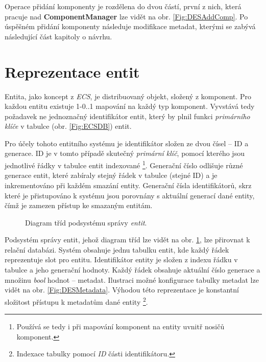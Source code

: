 Operace přidání komponenty je rozdělena do dvou částí, první z nich, která pracuje nad \textbf{ComponentManager} lze vidět na obr. \ref{Fig:DESAddComp}. Po úspěšném přidání komponenty následuje modifikace metadat, kterými se zabývá následující část kapitoly o návrhu.

\section{Reprezentace entit}

Entita, jako koncept z \emph{ECS}, je distribuovaný objekt, složený z komponent. Pro každou entitu existuje 1-0..1 mapování na každý typ komponent. Vyvstává tedy požadavek ne jednoznačný identifikátor entit, který by plnil funkci \emph{primárního klíče} v tabulce (obr. \ref{Fig:ECSDB}) entit.

Pro účely tohoto entitního systému je identifikátor složen ze dvou čísel -- ID a generace. ID je v tomto případě skutečný \emph{primární klíč}, pomocí kterého jsou jednotlivé řádky v tabulce entit indexované \footnote{Používá se tedy i při mapování komponent na entity uvnitř nosičů komponent.}. Generační číslo odlišuje různé generace entit, které zabíraly stejný řádek v tabulce (stejné ID) a je inkrementováno při každém smazání entity. Generační čísla identifikátorů, skrz které je přistupováno k systému jsou porovnány s aktuální generací dané entity, čímž je zamezen přístup ke smazaným entitám.

\begin{figure}[H]
	\caption{Diagram tříd podsystému správy \emph{entit}.}
	\label{Fig:DESEntityDiagram}
\end{figure}

Podsystém správy entit, jehož diagram tříd lze vidět na obr. \ref{Fig:DESEntityDiagram}, lze přirovnat k relační databázi. Systém obsahuje jednu tabulku entit, kde každý řádek reprezentuje slot pro entitu. Identifikátor entity je složen z indexu řádku v tabulce a jeho generační hodnoty. Každý řádek obsahuje aktuální číslo generace a množinu \emph{bool} hodnot -- metadat. Ilustraci možné konfigurace tabulky metadat lze vidět na obr. \ref{Fig:DESMetadata}. Výhodou této reprezentace je konstantní složitost přístupu k metadatům dané entity \footnote{Indexace tabulky pomocí \emph{ID} části identifikátoru.}. 

